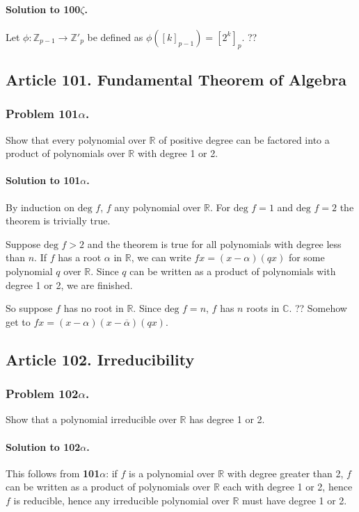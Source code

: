\paragraph*{Solution to 100$\zeta$.}
Let $\phi : \mathbb{Z}_{p-1} \rightarrow \mathbb{Z}'_p$ be defined as
$\phi([k]_{p-1}) = [2^k]_p$. ??
\subsection{Article 101. Fundamental Theorem of Algebra}

\subsubsection{Problem 101$\alpha$.}
Show that every polynomial over $\mathbb{R}$ of positive degree can be factored
into a product of polynomials over $\mathbb{R}$ with degree 1 or 2.

\paragraph*{Solution to 101$\alpha$.}
By induction on $\mbox{deg } f$, $f$ any polynomial over $\mathbb{R}$. For
$\mbox{deg } f = 1$ and $\mbox{deg } f = 2$ the theorem is trivially true.

Suppose $\mbox{deg } f > 2$ and the theorem is true for all polynomials with
degree less than $n$. If $f$ has a root $\alpha$ in $\mathbb{R}$, we can write
$fx = (x-\alpha)(qx)$ for some polynomial $q$ over $\mathbb{R}$. Since $q$ can
be written as a product of polynomials with degree 1 or 2, we are finished.

So suppose $f$ has no root in $\mathbb{R}$. Since $\mbox{deg } f = n$, $f$ has
$n$ roots in $\mathbb{C}$. ??
Somehow get to $fx = (x-\alpha)(x-\overline{\alpha})(qx)$.
\subsection{Article 102. Irreducibility}

\subsubsection{Problem 102$\alpha$.}
Show that a polynomial irreducible over $\mathbb{R}$ has degree 1 or 2.

\paragraph*{Solution to 102$\alpha$.}
This follows from \textbf{101$\alpha$}: if $f$ is a polynomial over $\mathbb{R}$
with degree greater than 2, $f$ can be written as a product of polynomials over
$\mathbb{R}$ each with degree 1 or 2, hence $f$ is reducible, hence any
irreducible polynomial over $\mathbb{R}$ must have degree 1 or 2.

